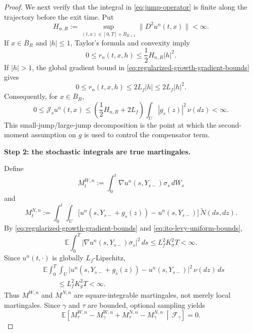 \documentclass[10pt,a4paper]{amsart}
\begin{document}
\begin{proof}
	We next verify that the integral in
	\eqref{eq:jump-operator} is finite along the trajectory before the
	exit time. Put
	\[
	H_{n,R}
	:=
	\sup_{(t,x)\in[0,T]\times\overline B_{R+1}}
	\|D^2u^n(t,x)\|
	<\infty.
	\]
	If \(x\in\overline B_R\) and \(|h|\leq1\), Taylor's formula and
	convexity imply
	\begin{equation}
		\label{eq:small-jump-remainder}
		0
		\leq
		r_n(t,x,h)
		\leq
		\frac12 H_{n,R}|h|^2.
	\end{equation}
	If \(|h|>1\), the global gradient bound in
	\eqref{eq:regularized-growth-gradient-bounds} gives
	\begin{equation}
		\label{eq:large-jump-remainder}
		0
		\leq
		r_n(t,x,h)
		\leq
		2L_f|h|
		\leq
		2L_f|h|^2.
	\end{equation}
	Consequently, for \(x\in\overline B_R\),
	\begin{equation}
		\label{eq:jump-operator-integrability}
		0
		\leq
		\mathcal J_su^n(t,x)
		\leq
		\left(
		\frac12 H_{n,R}+2L_f
		\right)
		\int_U|g_s(z)|^2\,\nu(dz)
		<\infty.
	\end{equation}
	This small-jump/large-jump decomposition is the point at which the
	second-moment assumption on \(g\) is used to control the compensator
	term.
	
	
	\textbf{Step 2: the stochastic integrals are true martingales.}
	
	Define
	\[
	M_t^{W,n}
	:=
	\int_0^t
	\nabla u^n(s,Y_{s-})\sigma_s\,dW_s
	\]
	and
	\[
	M_t^{N,n}
	:=
	\int_0^t\int_U
	\bigl[
	u^n(s,Y_{s-}+g_s(z))
	-u^n(s,Y_{s-})
	\bigr]
	\,\widetilde N(ds,dz).
	\]
	By \eqref{eq:regularized-growth-gradient-bounds} and
	\eqref{eq:ito-levy-uniform-bounds},
	\begin{equation}
		\label{eq:brownian-martingale-L2}
		\mathbb E\int_0^T
		|\nabla u^n(s,Y_{s-})\sigma_s|^2\,ds
		\leq
		L_f^2K_\sigma^2T
		<\infty.
	\end{equation}
	Since \(u^n(t,\cdot)\) is globally \(L_f\)-Lipschitz,
	\begin{equation}
		\label{eq:poisson-martingale-L2}
		\begin{aligned}
			&\mathbb E\int_0^T\int_U
			\bigl|
			u^n(s,Y_{s-}+g_s(z))
			-u^n(s,Y_{s-})
			\bigr|^2
			\,\nu(dz)\,ds
			\\
			&\qquad
			\leq
			L_f^2K_g^2T
			<\infty.
		\end{aligned}
	\end{equation}
	Thus \(M^{W,n}\) and \(M^{N,n}\) are square-integrable martingales,
	not merely local martingales. Since \(\gamma\) and \(\tau\) are
	bounded, optional sampling yields
	\begin{equation}
		\label{eq:conditional-martingale-increments-zero}
		\mathbb E\left[
		M_\tau^{W,n}-M_\gamma^{W,n}
		+
		M_\tau^{N,n}-M_\gamma^{N,n}
		\,\middle|\,
		\mathcal F_\gamma
		\right]
		=0.
	\end{equation}


\end{proof}
\end{document}
